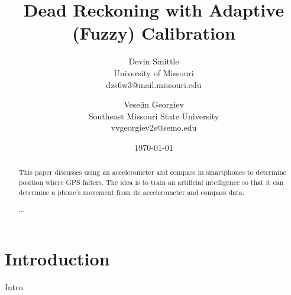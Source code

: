 \documentclass[twocolumn, draft]{article}
\begin{document}
\title{Dead Reckoning with Adaptive (Fuzzy) Calibration}
\author{ Devin Smittle \\ University of Missouri \\
  dzs6w3@mail.missouri.edu \and Veselin Georgiev \\ Southeast Missouri
State University \\ vvgeorgiev2s@semo.edu} \date{\today}
\maketitle

\begin{abstract}
  This paper discusses using an accelerometer and compass in
  smartphones to determine position where GPS falters. The idea is to
  train an artificial intelligence so that it can determine a phone's
  movement from its accelerometer and compass data.

  ...
\end{abstract}

\section{Introduction}
Intro.

\end{document}
